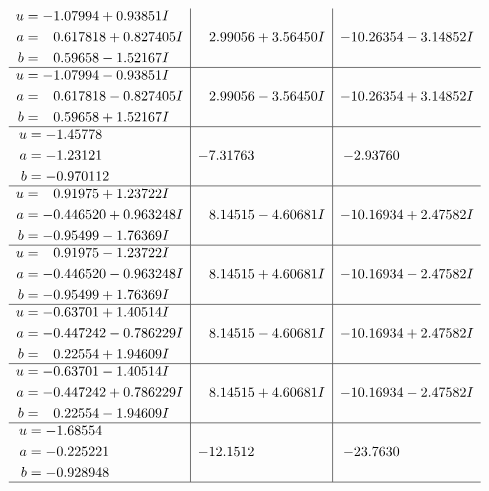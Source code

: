 \documentclass[1p]{elsarticle_modified}
\theoremstyle{definition}
\begin{document}
$$\begin{array}{c|c|c}
\begin{aligned}
u &= -1.07994 + 0.93851 I \\
a &= \phantom{-}0.617818 + 0.827405 I \\
b &= \phantom{-}0.59658 - 1.52167 I\end{aligned}
 & \phantom{-}2.99056 + 3.56450 I & -10.26354 - 3.14852 I \\ \hline\begin{aligned}
u &= -1.07994 - 0.93851 I \\
a &= \phantom{-}0.617818 - 0.827405 I \\
b &= \phantom{-}0.59658 + 1.52167 I\end{aligned}
 & \phantom{-}2.99056 - 3.56450 I & -10.26354 + 3.14852 I \\ \hline\begin{aligned}
u &= -1.45778\phantom{ +0.000000I} \\
a &= -1.23121\phantom{ +0.000000I} \\
b &= -0.970112\phantom{ +0.000000I}\end{aligned}
 & -7.31763\phantom{ +0.000000I} & -2.93760\phantom{ +0.000000I} \\ \hline\begin{aligned}
u &= \phantom{-}0.91975 + 1.23722 I \\
a &= -0.446520 + 0.963248 I \\
b &= -0.95499 - 1.76369 I\end{aligned}
 & \phantom{-}8.14515 - 4.60681 I & -10.16934 + 2.47582 I \\ \hline\begin{aligned}
u &= \phantom{-}0.91975 - 1.23722 I \\
a &= -0.446520 - 0.963248 I \\
b &= -0.95499 + 1.76369 I\end{aligned}
 & \phantom{-}8.14515 + 4.60681 I & -10.16934 - 2.47582 I \\ \hline\begin{aligned}
u &= -0.63701 + 1.40514 I \\
a &= -0.447242 - 0.786229 I \\
b &= \phantom{-}0.22554 + 1.94609 I\end{aligned}
 & \phantom{-}8.14515 - 4.60681 I & -10.16934 + 2.47582 I \\ \hline\begin{aligned}
u &= -0.63701 - 1.40514 I \\
a &= -0.447242 + 0.786229 I \\
b &= \phantom{-}0.22554 - 1.94609 I\end{aligned}
 & \phantom{-}8.14515 + 4.60681 I & -10.16934 - 2.47582 I \\ \hline\begin{aligned}
u &= -1.68554\phantom{ +0.000000I} \\
a &= -0.225221\phantom{ +0.000000I} \\
b &= -0.928948\phantom{ +0.000000I}\end{aligned}
 & -12.1512\phantom{ +0.000000I} & -23.7630\phantom{ +0.000000I}\\
 \hline 
 \end{array}$$\newpage\newpage\renewcommand{\arraystretch}{1}
\end{document}
